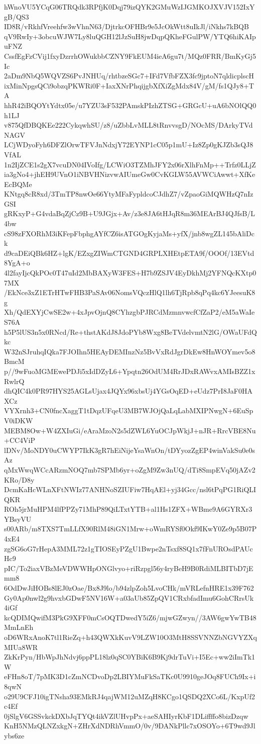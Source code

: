 hWnoVU5YCqG06TRQdk3RPfjK0Dqj79izQYK2GMuWzIJGMKOJXVJV152IxYgB/QS3
ID8R/vRkhfVreehfw3wVhnN63/DjtrkcOFHBr9e5JcOkWtt8uIkJl/iNkhs7kBQB
qV9RwIy+3obcuWJW7Ly8luQGH12lJzSuH8jwDqpQKheFGulPW/YTQ6hiKAIpuFNZ
CssfEgFzCVij1fxyDzrrhOWukbbCZNY9FkEUM4ieA6gu7t/MQz0FRR/BmKyGj5Ic
2aDm9NbQ5WQVZS6PvJNHUq/rhtbzeSGc7+IFd7VfbFZX3fc9jptoN7qldicplscH
ixMinNpgsQCi9obzqPKWRi0F+IaxXNrPhqijgbXfXiZgMdx84V/gM/fs1QJy8+TA
hhR42iBQOYtYdtx05e/u7YZU3sF532PAmskPIzhZTSG+GRGcU+uA6bNOlQQ0h1LJ
v875QfDBQKEe222CykqwhSU/z8/uZbbLvMLL8tRnvvsgD/NOcMS/DArkyTVdNAGV
LCjWDyoFyh6DFZlOrwTFVJnNdxjY72EYNP1cC05p1mU+Iz8Zp0gKJZb3sQJ8VfAL
1n2IjZCE1s2gX7vcuDN04IVoIfg/LCWiO3TZMhJFY2x06rXlhFnMp++Trfz0LLjZ
ia3gNo4+jhEH9UVnO1iNBVHNizvwAIUmeGw0CvKGLW55AVWCiAwwt+XfKeEcBQMe
KNtgq8cR8xd/3TmTP8nwOe66YtyMFaFypldcoCJdhZ7/vZpaoGiMQWHzQ7nIzGSI
gRKxyP+G4vdaBqZjCz9B+U9JGjx+Av/z3e8JA6tHJqR8m36MEArBJ4QJfsB/L4bw
cS98zFXORhM3iKFepFbphgAYfCZ6isATGOgKyjaMs+yfX/jnb8wgZL145bAliDck
d9caDEiQBk6HZ+lgK/EZxgZIWmCTGND4GRPLXHEtpETA9f/OOOf/13EVtd8YgA+o
4l2fayIjcQkPOc0T47uId2MbBAXyW3FES+H7b9ZSJV4EyDkhMj2YFNQcKXtp07MX
/EkNce3xZ1ETrHTwFHB3PaSAv06NomsVQczHlQ1lh6TjRpb8qPq4kc6YJeesuK8g
Xh/QdEXYjCwSE2w+4xJpvOjnQ8CYhzgbPJRCdMzmnvwcfCfZaP2/eM5aWaIeS76A
h5P5lUS3n5x0RNcd/Re+thstAKdJ8JdoPYb8Wxg8BeTVdelvmtN2lG/OWaUFdQkc
W32nSJruhqIQka7FJOIhn5HEAyDEMInzNz5BvVxRdJgrDkEw8HnWOYmev5o8BmcM
p//9wFuoMGMEwePDJi5xIdDZyL6+Ypqtn26OdUM4RrJDxRAWvxAMIsBZZ1xRwlrQ
dhQIC4k0PR97HYS25AGLsUjax4JQYx96xbsUj4YGsOqED+eUdz7PrI8JaF0HAXCz
VYXrnh3+CN0fncXaggT1tDqzUFqeU3MB7WJOjQaLqLabMXIPNwgN+6EuSpV0iDKW
MEBM8Ow+W4ZXIuGi/eAraMzoN2s5dZWL6YuOCJpWkjJ+nJR+RrcVBE8Nu+CC4ViP
lDNv/MoNDY0uCWYP7IkK3gR7hEiNijeYsaWnOn/tDYyozZgEP4winVakSu0e0sAz
qMxWwqWCcARzmNOQ7mb7SPMb6yr+oZgM9Zw3nUQ/dTi8SmpEVq50jAZv2KRo/D8y
DcmKaHcWLnXFtNWIz77ANHNoSZIUFiw7HqAEl+yj34Gcc/nsl6tPqPG1RiQLIQKR
ROh5jrMuHPM4lfPPZy71MhP89QiLTxtYTB+al1Hs1ZFX+WBme9A6GYRXr3YBsyVU
s00ARb/m8TXS7TmLLfX90RlM48iGN1Mrw+oWmRYSf0Okf9IKwY0Ze9p5B07P4xE4
zgSG6oG7rHepA3MML72z1gTIOSEyPZgU1Bwpe2nTsxf8SQ1x7fFnUROsdPAUcHc9
pIC/To2iaxVBzMeVDWWHpONGlvyo+riRzpgl56y4ryBeH9B0RdiMLBITbD7jEmm8
6OdDwJiHOBs8lEJ0zOae/Bx8J9lo/b94zlpZoh5LvoCHk/mVRLefnHRE1x39F762
Gy0Ap0nwl2g9hvxbGDwF5NV16W+a03aUb85ZpQV1CRxbfadImu6GohCRrsUk4iGf
kcQDIMQwifM3PkG9XFF0mCsOQTDwedY5iZ6/mjwGZwyn//3AW6gwYwTB48MmLnEh
oD6WRxAnoK7tl1RieZq+h43QWXkKuvV9LZW10O3MtH8SSVNNZbNGVYZXqMIUa8WR
ZkKrPyn/HbWpJhNdvj6ppPL18lz0qSC0YBiK6B9Kj9drTuVi+I5Ec+ww2iImTk1W
eFHn8oT/7pMK3D1cZmNCDvoDp2LBIYMuFkSaTKc0U9910geJOq8FUCh9Ix+i8qwN
o29U9CFJ10igTNsha93EMkRJ4qajWM12uMZqH8KCgo1QSDQ2XCo6L/KxpUf2c4Ef
0jSlgV6GSSvkckDXbJqTYQt4ikVZlUHvpPx+aeSAHIyrKbF1DLiffffo8bizDzqw
KnH5NMzQLNZxkgN+ZHrXdNDRhVmmO/0v/9DANkPllc7xOSOYo+6T9wd9Jlybs6ze
